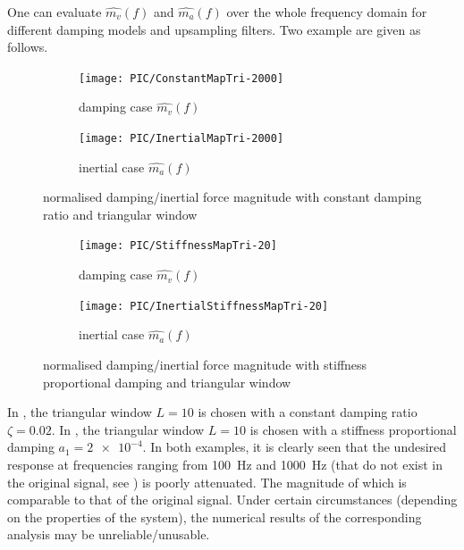 One can evaluate $\hat{m_v}\left(f\right)$ and $\hat{m_a}\left(f\right)$ over the whole frequency domain for different damping models and upsampling filters. Two example are given as follows.
\begin{figure}[htb!]
\centering
\begin{subfigure}{.48\textwidth}
\texttt{[image: PIC/ConstantMapTri-2000]}
\caption{damping case $\hat{m_v}\left(f\right)$}
\end{subfigure}
\begin{subfigure}{.48\textwidth}
\texttt{[image: PIC/InertialMapTri-2000]}
\caption{inertial case $\hat{m_a}\left(f\right)$}
\end{subfigure}
\caption{normalised damping/inertial force magnitude with constant damping ratio and triangular window}\label{fig:map_constant}
\end{figure}
\begin{figure}[htb!]
\centering
\begin{subfigure}{.48\textwidth}
\texttt{[image: PIC/StiffnessMapTri-20]}
\caption{damping case $\hat{m_v}\left(f\right)$}
\end{subfigure}
\begin{subfigure}{.48\textwidth}
\texttt{[image: PIC/InertialStiffnessMapTri-20]}
\caption{inertial case $\hat{m_a}\left(f\right)$}
\end{subfigure}
\caption{normalised damping/inertial force magnitude with stiffness proportional damping and triangular window}\label{fig:map_stiffness}
\end{figure}
In , the triangular window $L=10$ is chosen with a constant damping ratio $\zeta=\num{0.02}$. In , the triangular window $L=10$ is chosen with a stiffness proportional damping $a_1=\num{2e-4}$. In both examples, it is clearly seen that the undesired response at frequencies ranging from \SI{100}{\hertz} and \SI{1000}{\hertz} (that do not exist in the original signal, see ) is poorly attenuated. The magnitude of which is comparable to that of the original signal. Under certain circumstances (depending on the properties of the system), the numerical results of the corresponding analysis may be unreliable/unusable.
